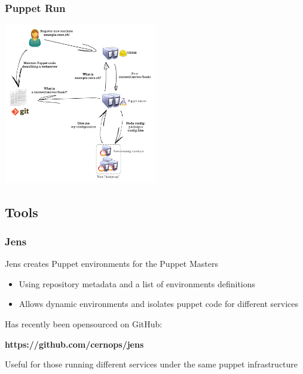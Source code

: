 \documentclass[aspectratio=169]{beamer}
\begin{document}

\begin{frame}
    \frametitle{Puppet Run}
    \vspace{-1em}
    \begin{center}
        \includegraphics[width=0.5\textwidth]{puppetrun3.png}
    \end{center}
\end{frame}


\subsection{Tools}
\begin{frame}
    \frametitle{Jens}
    Jens creates Puppet environments for the Puppet Masters
    \begin{itemize}
        \item Using repository metadata and a list of environments definitions
        \item Allows dynamic environments and isolates puppet code for different services
    \end{itemize}
    \vspace{2em}
    Has recently been opensourced on GitHub: \\
    \vspace{1em}
    \begin{center}
        \textbf{https://github.com/cernops/jens} \\
    \end{center}
    \vspace{1em}
    Useful for those running different services under the same puppet infrastructure
\end{frame}

\end{document}
